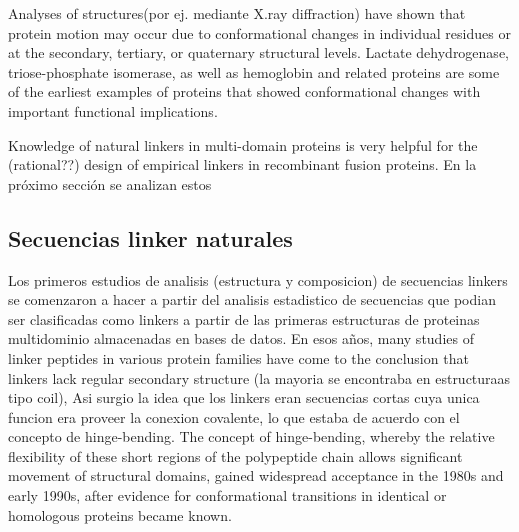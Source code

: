 Analyses of structures(por ej. mediante X.ray diffraction) have shown that protein motion may occur due to conformational changes in individual residues or at the secondary, tertiary, or quaternary structural levels. Lactate dehydrogenase, triose-phosphate isomerase, as well as hemoglobin and related proteins are some of the earliest examples of proteins that showed conformational changes with important functional implications.





Knowledge of natural linkers in multi-domain proteins is very helpful for the (rational??) design of empirical linkers in recombinant fusion proteins. 
En la próximo sección se analizan estos






























\subsection{Secuencias linker naturales}



Los primeros estudios de analisis (estructura y composicion) de secuencias linkers\cite{argos1990investigation} se comenzaron a hacer a partir del analisis estadistico de secuencias que podian ser clasificadas 
como linkers a partir de las primeras estructuras de proteinas multidominio almacenadas en bases de datos.
En esos años, many studies of linker peptides in various protein families have come to the conclusion that linkers lack regular secondary structure (la mayoria se encontraba en estructuraas tipo coil), 
Asi surgio la idea que los linkers eran secuencias cortas cuya unica funcion era proveer la conexion covalente, lo que estaba de acuerdo con el concepto de hinge-bending.
The concept of hinge-bending, whereby the relative flexibility of these short regions of the polypeptide chain allows significant movement of structural domains, gained widespread acceptance in
the 1980s and early 1990s, after evidence for conformational transitions in identical or homologous proteins became known.

